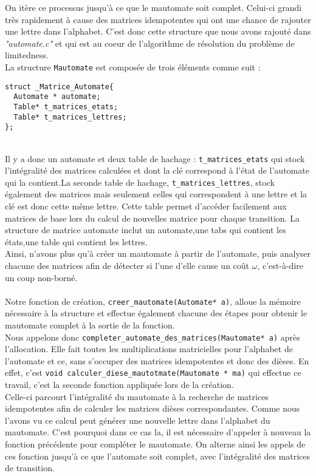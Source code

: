 \documentclass{report}
\begin{document}
On itère ce processus jusqu'à ce que le mautomate soit complet. Celui-ci grandi très rapidement à cause des matrices idempotentes qui ont une chance de rajouter une lettre dans l'alphabet. C'est donc cette structure que nous avons rajouté dans \textit{"automate.c"} et qui est au coeur de l'algorithme de résolution du problème de limitedness.\\

La structure \verb?Mautomate? est composée de trois éléments comme suit :

\begin{lstlisting}[frame=single]
struct _Matrice_Automate{
  Automate * automate;
  Table* t_matrices_etats;
  Table* t_matrices_lettres;
};
\end{lstlisting}
$ $\\\\

Il y a donc un automate et deux table de hachage : \verb?t_matrices_etats? qui stock l'intégralité des matrices calculées et dont la clé correspond à l'état de l'automate qui la contient.La seconde table de hachage, \verb?t_matrices_lettres?, stock également des matrices mais seulement celles qui correspondent à une lettre et la clé est donc cette même lettre. Cette table permet d’accéder facilement aux matrices de base lors du calcul de nouvelles matrice pour chaque transition.
La structure de matrice automate inclut un automate,une tabs qui contient les états,une table qui contient les lettres.\\

Ainsi, n'avons plus qu'à créer un mautomate à partir de l'automate, puis analyser chacune des matrices afin de détecter si l'une d'elle cause un coût $\omega$, c'est-à-dire un coup non-borné.
\\\\
Notre fonction de création, \verb?creer_mautomate(Automate* a)?, alloue la mémoire nécessaire à la structure et effectue également chacune des étapes pour obtenir le mautomate complet à la sortie de la fonction.\\
Nous appelons donc \verb?completer_automate_des_matrices(Mautomate* a)? après l'allocation. Elle fait toutes les multiplications matricielles pour l'alphabet de l'automate et ce, sans s'occuper des matrices idempotentes et donc des dièses. En effet, c'est \verb?void calculer_diese_mautotmate(Mautomate * ma)? qui effectue ce travail, c'est la seconde fonction appliquée lors de la création. \\
Celle-ci parcourt l'intégralité du mautomate à la recherche de matrices idempotentes afin de calculer les matrices dièses correspondantes. Comme nous l'avons vu ce calcul peut générer une nouvelle lettre dans l'alphabet du mautomate. C'est pourquoi dans ce cas la, il est nécessaire d'appeler à nouveau la fonction précédente pour compléter le mautomate. On alterne ainsi les appels de ces fonction jusqu'à ce que l'automate soit complet, avec l'intégralité des matrices de transition.\\
\end{document}
